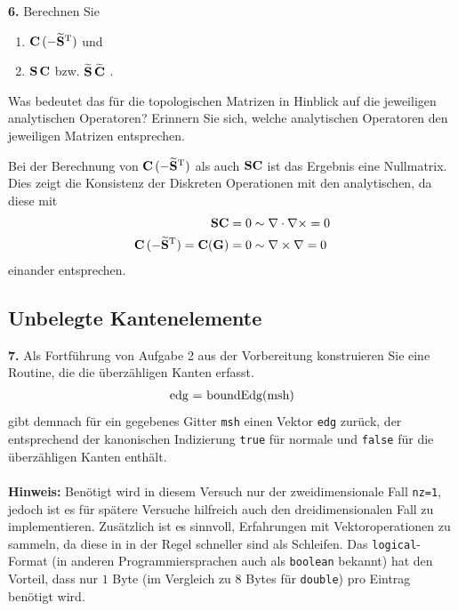 \documentclass[Protokollheft.tex]{subfiles}
\begin{document}
   \begin{framed}
	\noindent \textbf{6.} Berechnen Sie
                    \begin{enumerate}
                        \item $\mathbf{C}\, (-\widetilde{\mathbf{S}}^{\text{T}})$ und
                        \item $\mathbf{S}\, \mathbf{C}$ bzw. $\widetilde{\mathbf{S}}\, \widetilde{\mathbf{C}}$ \; .
                    \end{enumerate}
                    Was bedeutet das für die topologischen Matrizen in Hinblick
                    auf die jeweiligen analytischen Operatoren? Erinnern Sie sich, welche analytischen Operatoren den jeweiligen Matrizen entsprechen.\label{exer:CG_SC}
\end{framed}
\noindent
Bei der Berechnung von $\mathbf{C}\, (-\widetilde{\mathbf{S}}^{\text{T}})$ als auch $\mathbf{S}\mathbf{C}$ ist das Ergebnis eine Nullmatrix. Dies zeigt die Konsistenz der Diskreten Operationen mit den analytischen, da diese mit
\begin{align*}
	\mathbf{S}\mathbf{C} = 0  &\sim  \nabla \cdot \nabla \times = 0\\
	\mathbf{C}\, (-\widetilde{\mathbf{S}}^{\text{T}})=\mathbf{C}(\mathbf{G}) = 0 &\sim  \nabla \times \nabla	= 0
\end{align*}
einander entsprechen. 
{\subsection{Unbelegte Kantenelemente}}

        \begin{framed}
	\noindent \textbf{7.} Als Fortführung von Aufgabe 2 aus der Vorbereitung
                    konstruieren Sie eine Routine, die die überzähligen Kanten erfasst.
                    \begin{align}
                        \lstinline{edg = boundEdg(msh)}
                    \end{align}
                    gibt demnach für ein gegebenes Gitter \lstinline{msh} einen Vektor \lstinline{edg} zurück, der
                    entsprechend der kanonischen Indizierung \lstinline{true} für normale und \lstinline{false}
                    für die überzähligen Kanten enthält.\\
                    \ \\
                    {\textbf{Hinweis:}} Benötigt wird in diesem Versuch nur der zweidimensionale Fall \lstinline{nz=1}, jedoch ist es für spätere Versuche hilfreich auch den dreidimensionalen Fall zu implementieren. Zusätzlich ist es sinnvoll, Erfahrungen mit Vektoroperationen zu sammeln, da diese in \matlab in der Regel schneller sind als Schleifen. Das \lstinline{logical}-Format (in anderen Programmiersprachen auch als \lstinline{boolean} bekannt) hat den Vorteil, dass nur $1$ Byte (im Vergleich zu $8$ Bytes für \lstinline{double}) pro Eintrag benötigt wird.\label{exer:boundEdg}
\end{framed}
\end{document}
